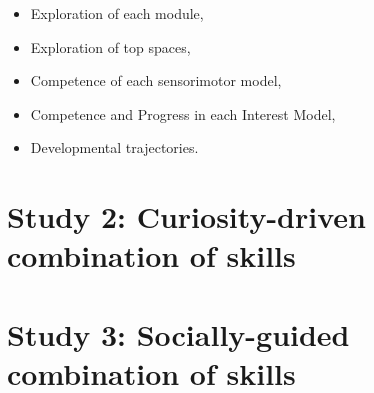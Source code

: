 \documentclass[12pt]{article}
\begin{document}
			\begin{itemize}
				\item Exploration of each module,
				\item Exploration of top spaces,
				\item Competence of each sensorimotor model,
				\item Competence and Progress in each Interest Model,
				\item Developmental trajectories.
			\end{itemize}
			
		
	
	
%


\section{Study 2: Curiosity-driven combination of skills}
\label{study2}


%


\section{Study 3: Socially-guided combination of skills}
\label{study3}

%



\small


\end{document}
